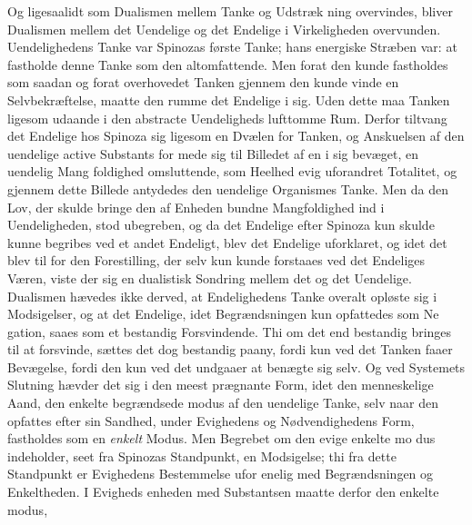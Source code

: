 \documentclass[12pt,a4paper]{book}
\begin{document}
Og ligesaalidt som Dualismen mellem Tanke og Udstræk\-%
ning overvindes, bliver Dualismen mellem det Uendelige og
det Endelige i Virkeligheden overvunden. Uendelighedens
Tanke var Spinozas første Tanke; hans energiske Stræben var:
at fastholde denne Tanke som den altomfattende. Men forat
den kunde fastholdes som saadan og forat overhovedet Tanken
gjennem den kunde vinde en Selvbekræftelse, maatte den
rumme det Endelige i sig. Uden dette maa Tanken ligesom
udaande i den abstracte Uendeligheds lufttomme Rum. Derfor
tiltvang det Endelige hos Spinoza sig ligesom en Dvælen for
Tanken, og Anskuelsen af den uendelige active Substants for\-%
mede sig til Billedet af en i sig bevæget, en uendelig Mang\-%
foldighed omsluttende, som Heelhed evig uforandret Totalitet,
og gjennem dette Billede antydedes den uendelige Organismes
Tanke. Men da den Lov, der skulde bringe den af Enheden
bundne Mangfoldighed ind i Uendeligheden, stod ubegreben,
og da det Endelige efter Spinoza kun skulde kunne begribes
ved et andet Endeligt, blev det Endelige uforklaret, og idet det
blev til for den Forestilling, der selv kun kunde forstaaes ved
det Endeliges Væren, viste der sig en dualistisk Sondring
mellem det og det Uendelige. Dualismen hævedes ikke derved,
at Endelighedens Tanke overalt opløste sig i Modsigelser, og
at det Endelige, idet Begrændsningen kun opfattedes som Ne\-%
gation, saaes som et bestandig Forsvindende. Thi om det
end bestandig bringes til at forsvinde, sættes det dog bestandig
paany, fordi kun ved det Tanken faaer Bevægelse, fordi den
kun ved det undgaaer at benægte sig selv. Og ved Systemets
Slutning hævder det sig i den meest prægnante Form, idet
den menneskelige Aand, den enkelte begrændsede modus af
den uendelige Tanke, selv naar den opfattes efter sin Sandhed,
under Evighedens og Nødvendighedens Form, fastholdes som
en \emph{enkelt} Modus. Men Begrebet om den evige enkelte mo\-%
dus indeholder, seet fra Spinozas Standpunkt, en Modsigelse;
thi fra dette Standpunkt er Evighedens Bestemmelse ufor\-%
enelig med Begrændsningen og Enkeltheden. I Evigheds\-%
enheden med Substantsen maatte derfor den enkelte modus,
\end{document}
